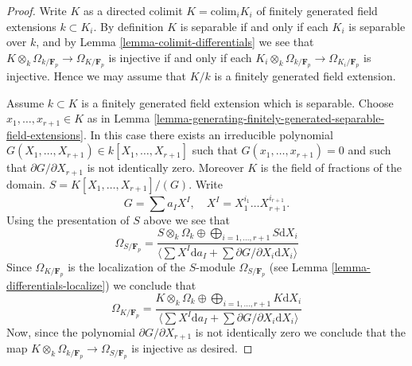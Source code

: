 \begin{proof}
Write $K$ as a directed colimit $K = \text{colim}_i K_i$ of finitely generated 
field extensions $k \subset K_i$. By definition $K$ is separable if and only
if each $K_i$ is separable over $k$, and by
Lemma \ref{lemma-colimit-differentials} we see that
$K \otimes_k \Omega_{k/\mathbf{F}_p} \to \Omega_{K/\mathbf{F}_p}$
is injective if and only if each
$K_i \otimes_k \Omega_{k/\mathbf{F}_p} \to \Omega_{K_i/\mathbf{F}_p}$
is injective. Hence we may assume that $K/k$ is a finitely generated field
extension.

\medskip\noindent
Assume $k \subset K$ is a finitely generated field extension which is
separable. Choose $x_1, \ldots, x_{r + 1} \in K$ as in
Lemma \ref{lemma-generating-finitely-generated-separable-field-extensions}.
In this case there exists an irreducible polynomial
$G(X_1, \ldots, X_{r + 1}) \in k[X_1, \ldots, X_{r + 1}]$
such that $G(x_1, \ldots, x_{r + 1}) = 0$ and such that
$\partial G/\partial X_{r + 1}$ is not identically zero.
Moreover $K$ is the field of fractions of the domain.
$S = K[X_1, \ldots, X_{r + 1}]/(G)$.
Write
$$
G = \sum a_I X^I,\quad X^I = X_1^{i_1}\ldots X_{r + 1}^{i_{r + 1}}.
$$
Using the presentation of $S$ above we see that
$$
\Omega_{S/\mathbf{F}_p}
=
\frac{
S \otimes_k \Omega_k \oplus
\bigoplus\nolimits_{i = 1, \ldots, r + 1} S\text{d}X_i
}{
\langle
\sum X^I \text{d}a_I + \sum \partial G/\partial X_i \text{d}X_i
\rangle
}
$$
Since $\Omega_{K/\mathbf{F}_p}$ is the localization
of the $S$-module $\Omega_{S/\mathbf{F}_p}$ (see
Lemma \ref{lemma-differentials-localize}) we conclude
that
$$
\Omega_{K/\mathbf{F}_p}
=
\frac{
K \otimes_k \Omega_k \oplus
\bigoplus\nolimits_{i = 1, \ldots, r + 1} K\text{d}X_i
}{
\langle
\sum X^I \text{d}a_I + \sum \partial G/\partial X_i \text{d}X_i
\rangle
}
$$
Now, since the polynomial $\partial G/\partial X_{r + 1}$ is not identically
zero we conclude that the map
$K \otimes_k \Omega_{k/\mathbf{F}_p} \to \Omega_{S/\mathbf{F}_p}$
is injective as desired.


\end{proof}
